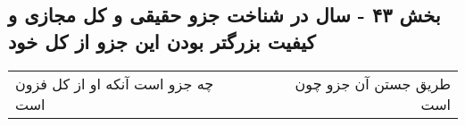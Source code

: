 \begin{center}
\section*{بخش ۴۳ - سال در شناخت جزو حقیقی و کل مجازی و کیفیت بزرگتر بودن این جزو از کل خود}
\label{sec:sh043}
\begin{longtable}{l p{0.5cm} r}
چه جزو است آنکه او از کل فزون است
&&
طریق جستن آن جزو چون است
\\
\end{longtable}
\end{center}
